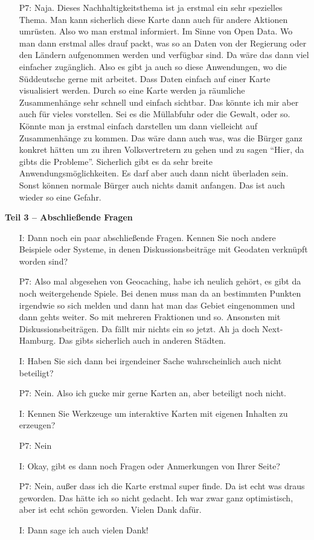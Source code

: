 \begin{itemize}
    \item[P7:] Naja. Dieses Nachhaltigkeitsthema ist ja erstmal ein sehr spezielles Thema. Man kann sicherlich diese Karte dann auch f{\"u}r andere Aktionen umr{\"u}sten. Also wo man erstmal informiert. Im Sinne von Open Data. Wo man dann erstmal alles drauf packt, was so an Daten von der Regierung oder den L{\"a}ndern aufgenommen werden und verf{\"u}gbar sind. Da w{\"a}re das dann viel einfacher zug{\"a}nglich. Also es gibt ja auch so diese Anwendungen, wo die S{\"u}ddeutsche gerne mit arbeitet. Dass Daten einfach auf einer Karte visualisiert werden. Durch so eine Karte werden ja r{\"a}umliche Zusammenh{\"a}nge sehr schnell und einfach sichtbar. Das k{\"o}nnte ich mir aber auch f{\"u}r vieles vorstellen. Sei es die M{\"u}llabfuhr oder die Gewalt, oder so. K{\"o}nnte man ja erstmal einfach darstellen um dann vielleicht auf Zusammenh{\"a}nge zu kommen. Das w{\"a}re dann auch was, was die B{\"u}rger ganz konkret h{\"a}tten um zu ihren Volksvertretern zu gehen und zu sagen "`Hier, da gibts die Probleme"'. Sicherlich gibt es da sehr breite Anwendungsm{\"o}glichkeiten. Es darf aber auch dann nicht {\"u}berladen sein. Sonst k{\"o}nnen normale B{\"u}rger auch nichts damit anfangen. Das ist auch wieder so eine Gefahr.
\end{itemize}

\textbf{Teil 3 -- Abschlie{\ss}ende Fragen}
\begin{itemize}
    \item[I:] Dann noch ein paar abschlie{\ss}ende Fragen. Kennen Sie noch andere Beispiele oder Systeme, in denen Diskussionsbeitr{\"a}ge mit Geodaten verkn{\"u}pft worden sind?
    \item[P7:] Also mal abgesehen von Geocaching, habe ich neulich geh{\"o}rt, es gibt da noch weitergehende Spiele. Bei denen muss man da an bestimmten Punkten irgendwie so sich melden und dann hat man das Gebiet eingenommen und dann gehts weiter. So mit mehreren Fraktionen und so. Ansonsten mit Diskussionsbeitr{\"a}gen. Da f{\"a}llt mir nichts ein so jetzt. Ah ja doch Next-Hamburg. Das gibts sicherlich auch in anderen St{\"a}dten.
    \item[I:] Haben Sie sich dann bei irgendeiner Sache wahrscheinlich auch nicht beteiligt?
    \item[P7:] Nein. Also ich gucke mir gerne Karten an, aber beteiligt noch nicht.
    \item[I:] Kennen Sie Werkzeuge um interaktive Karten mit eigenen Inhalten zu erzeugen?
    \item[P7:] Nein
    \item[I:] Okay, gibt es dann noch Fragen oder Anmerkungen von Ihrer Seite? 
    \item[P7:] Nein, au{\ss}er dass ich die Karte erstmal super finde. Da ist echt was draus geworden. Das h{\"a}tte ich so nicht gedacht. Ich war zwar ganz optimistisch, aber ist echt sch{\"o}n geworden. Vielen Dank daf{\"u}r.
    \item[I:] Dann sage ich auch vielen Dank!
\end{itemize}